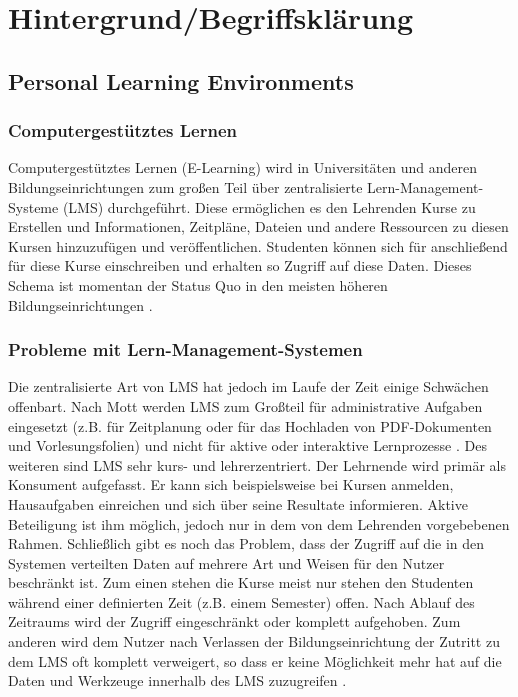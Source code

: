 \chapter{Hintergrund/Begriffsklärung} 
\label{chapter:Kapitel2}
\section{Personal Learning Environments}
\subsection{Computergestütztes Lernen}\label{section:e-learning}
Computergestütztes Lernen (E-Learning) wird in Universitäten und anderen Bildungseinrichtungen zum großen Teil über zentralisierte Lern-Management-Systeme (LMS) durchgeführt. Diese ermöglichen es den Lehrenden Kurse zu Erstellen und Informationen, Zeitpläne, Dateien und andere Ressourcen zu diesen Kursen hinzuzufügen und veröffentlichen. Studenten können sich für anschließend für diese Kurse einschreiben und erhalten so Zugriff auf diese Daten. Dieses Schema ist momentan der Status Quo in den meisten höheren Bildungseinrichtungen \cite{Mott2010}. 

\subsection{Probleme mit Lern-Management-Systemen}
Die zentralisierte Art von LMS hat jedoch im Laufe der Zeit einige Schwächen offenbart. Nach Mott werden LMS zum Großteil für administrative Aufgaben eingesetzt (z.B. für Zeitplanung oder für das Hochladen von PDF-Dokumenten und Vorlesungsfolien) und nicht für aktive oder interaktive Lernprozesse \cite{Mott2010}. Des weiteren sind LMS sehr kurs- und lehrerzentriert. Der Lehrnende wird primär als Konsument aufgefasst. Er kann sich beispielsweise bei Kursen anmelden, Hausaufgaben einreichen und sich über seine Resultate informieren. Aktive Beteiligung ist ihm möglich, jedoch nur in dem von dem Lehrenden vorgebebenen Rahmen.
Schließlich gibt es noch das Problem, dass der Zugriff auf die in den Systemen verteilten Daten auf mehrere Art und Weisen für den Nutzer beschränkt ist. Zum einen stehen die Kurse meist nur stehen den Studenten während einer definierten Zeit (z.B. einem Semester) offen. Nach Ablauf des Zeitraums wird der Zugriff eingeschränkt oder komplett aufgehoben. Zum anderen wird dem Nutzer nach Verlassen der Bildungseinrichtung der Zutritt zu dem LMS oft komplett verweigert, so dass er keine Möglichkeit mehr hat auf die Daten und Werkzeuge innerhalb des LMS zuzugreifen \cite{Schaffert2008a}.

